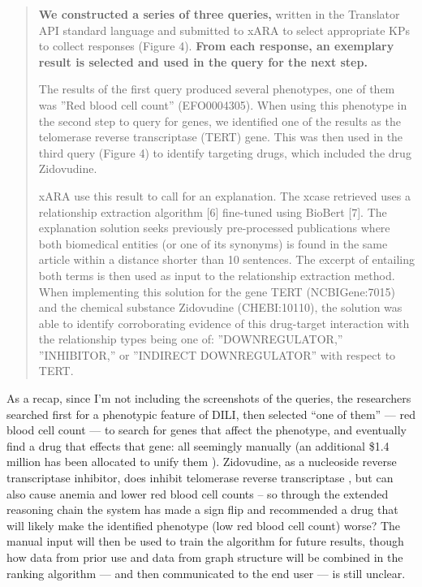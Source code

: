 \documentclass[10pt]{article}
\begin{document}
\begin{multicols}{2}
\begin{quote}
\textbf{We constructed a series of three queries,} written in the
Translator API standard language and submitted to xARA to select
appropriate KPs to collect responses (Figure 4). \textbf{From each
response, an exemplary result is selected and used in the query for the
next step.}

The results of the first query produced several phenotypes, one of them
was ''Red blood cell count'' (EFO0004305). When using this phenotype in
the second step to query for genes, we identified one of the results as
the telomerase reverse transcriptase (TERT) gene. This was then used in
the third query (Figure 4) to identify targeting drugs, which included
the drug Zidovudine.

xARA use this result to call for an explanation. The xcase retrieved
uses a relationship extraction algorithm {[}6{]} fine-tuned using
BioBert {[}7{]}. The explanation solution seeks previously pre-processed
publications where both biomedical entities (or one of its synonyms) is
found in the same article within a distance shorter than 10 sentences.
The excerpt of entailing both terms is then used as input to the
relationship extraction method. When implementing this solution for the
gene TERT (NCBIGene:7015) and the chemical substance Zidovudine
(CHEBI:10110), the solution was able to identify corroborating evidence
of this drug-target interaction with the relationship types being one
of: ''DOWNREGULATOR,'' ''INHIBITOR,'' or ''INDIRECT DOWNREGULATOR'' with
respect to TERT. \cite{goelExplanationContainerCaseBased2021} 
\end{quote}

As a recap, since I'm not including the screenshots of the queries, the
researchers searched first for a phenotypic feature of DILI, then
selected ``one of them'' --- red blood cell count --- to search for
genes that affect the phenotype, and eventually find a drug that effects
that gene: all seemingly manually (an additional \$1.4 million has been
allocated to unify them \cite{haendelCommonDialectInfrastructure2021} ). Zidovudine, as a nucleoside reverse transcriptase inhibitor, does
inhibit telomerase reverse transcriptase \cite{hukezalieVitroExVivo2012} , but can also cause anemia and lower red
blood cell counts \cite{ZidovudinePatientNIH}  -- so through the
extended reasoning chain the system has made a sign flip and recommended
a drug that will likely make the identified phenotype (low red blood
cell count) worse? The manual input will then be used to train the
algorithm for future results, though how data from prior use and data
from graph structure will be combined in the ranking algorithm --- and
then communicated to the end user --- is still unclear.


\end{multicols}
\end{document}
